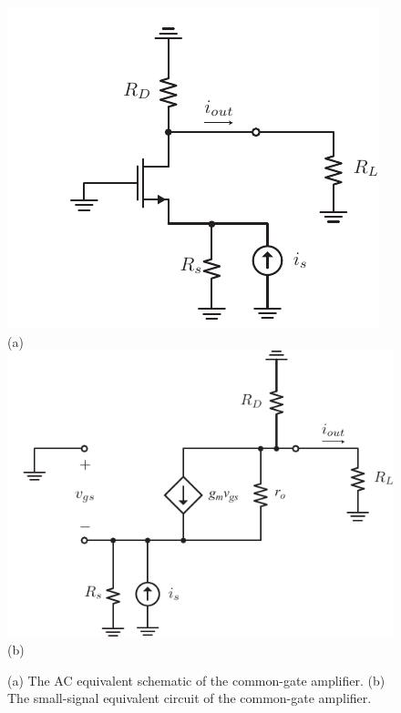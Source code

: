 \begin{figure}[H]
\centering
\includegraphics[scale=1.05]{cgamp_is_ac}\\
(a)\\[0.1cm]
\includegraphics[scale=1.05]{cgamp_is_ac_ss}\\
(b)\\
\caption{(a) The AC equivalent schematic of the common-gate amplifier.  (b) The small-signal equivalent circuit of the common-gate amplifier.}
\label{fig:cgamp_is_ac}
\end{figure}
\newpage
